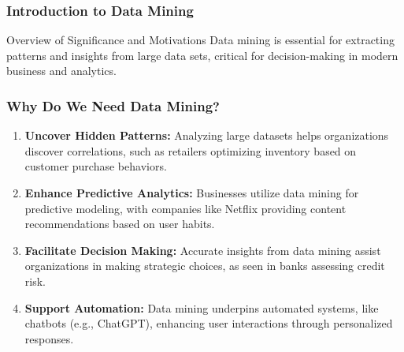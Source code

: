 \documentclass[aspectratio=169]{beamer}
\begin{document}
\frame{\titlepage}

\begin{frame}[fragile]
    \frametitle{Introduction to Data Mining}
    \begin{block}{Overview of Significance and Motivations}
        Data mining is essential for extracting patterns and insights from large data sets, critical for decision-making in modern business and analytics.
    \end{block}
\end{frame}

\begin{frame}[fragile]
    \frametitle{Why Do We Need Data Mining?}
    \begin{enumerate}
        \item \textbf{Uncover Hidden Patterns:} 
        Analyzing large datasets helps organizations discover correlations, such as retailers optimizing inventory based on customer purchase behaviors.

        \item \textbf{Enhance Predictive Analytics:} 
        Businesses utilize data mining for predictive modeling, with companies like Netflix providing content recommendations based on user habits.

        \item \textbf{Facilitate Decision Making:} 
        Accurate insights from data mining assist organizations in making strategic choices, as seen in banks assessing credit risk.

        \item \textbf{Support Automation:} 
        Data mining underpins automated systems, like chatbots (e.g., ChatGPT), enhancing user interactions through personalized responses.
    \end{enumerate}
\end{frame}
\end{document}
